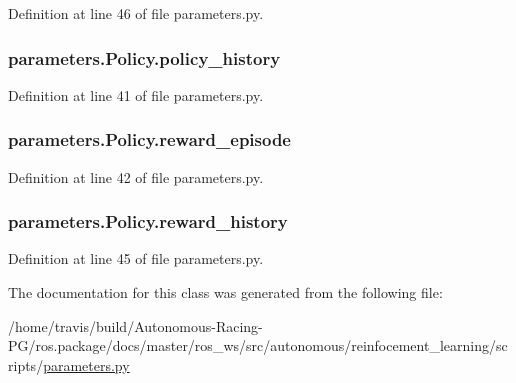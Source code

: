 Definition at line 46 of file parameters.\+py.

\subsubsection[{\texorpdfstring{policy\+\_\+history}{policy_history}}]{\setlength{\rightskip}{0pt plus 5cm}parameters.\+Policy.\+policy\+\_\+history}\hypertarget{classparameters_1_1_policy_acd82a6d1c04d80cf93be0995da717b92}{}\label{classparameters_1_1_policy_acd82a6d1c04d80cf93be0995da717b92}


Definition at line 41 of file parameters.\+py.

\subsubsection[{\texorpdfstring{reward\+\_\+episode}{reward_episode}}]{\setlength{\rightskip}{0pt plus 5cm}parameters.\+Policy.\+reward\+\_\+episode}\hypertarget{classparameters_1_1_policy_a5af351c9adfe2c558517035310d4dee8}{}\label{classparameters_1_1_policy_a5af351c9adfe2c558517035310d4dee8}


Definition at line 42 of file parameters.\+py.

\subsubsection[{\texorpdfstring{reward\+\_\+history}{reward_history}}]{\setlength{\rightskip}{0pt plus 5cm}parameters.\+Policy.\+reward\+\_\+history}\hypertarget{classparameters_1_1_policy_a206a48d384964a49ac0c64d95b33d035}{}\label{classparameters_1_1_policy_a206a48d384964a49ac0c64d95b33d035}


Definition at line 45 of file parameters.\+py.



The documentation for this class was generated from the following file\+:\begin{DoxyCompactItemize}
\item 
/home/travis/build/\+Autonomous-\/\+Racing-\/\+P\+G/ros.\+package/docs/master/ros\+\_\+ws/src/autonomous/reinfocement\+\_\+learning/scripts/\hyperlink{parameters_8py}{parameters.\+py}\end{DoxyCompactItemize}
